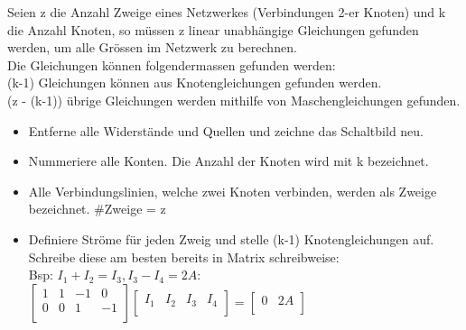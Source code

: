 \beginip
Seien z die Anzahl Zweige eines Netzwerkes (Verbindungen 2-er Knoten) und k die Anzahl Knoten, so müssen z linear unabhängige Gleichungen gefunden werden, um alle Grössen im Netzwerk zu berechnen.  \\Die Gleichungen können folgendermassen gefunden werden: \\
\formulaBegin
(k-1) Gleichungen können aus Knotengleichungen gefunden werden. \\
(z - (k-1)) übrige Gleichungen werden mithilfe von Maschengleichungen gefunden.
\formulaEnd
\iend


\beginip
\begin{center}
	\begin{itemize}
		\item Entferne alle Widerstände und Quellen und zeichne das Schaltbild neu.
		\item Nummeriere alle Konten. Die Anzahl der Knoten wird mit k bezeichnet.
		\item Alle Verbindungslinien, welche zwei Knoten verbinden, werden als Zweige bezeichnet. \#Zweige = z
		\item Definiere Ströme für jeden Zweig und stelle (k-1) Knotengleichungen auf. Schreibe diese am besten bereits in Matrix schreibweise: \\
		      Bsp: $I_1 + I_2 = I_3, I_3 - I_4 = 2A $: \\
		      $
		      \left[ {\begin{array}{cccc}
		      		1 & 1 & -1 & 0 \\
		      		0 & 0 & 1 & -1 \\					\end{array} } \right] \left[ {\begin{array}{c} I_1 & I_2 & I_3 & I_4 \\ \end{array} } \right] =   \left[ {\begin{array}{c}  0 & 2A\\ \end{array} } \right] $ \\


\end{itemize}
\end{center}
